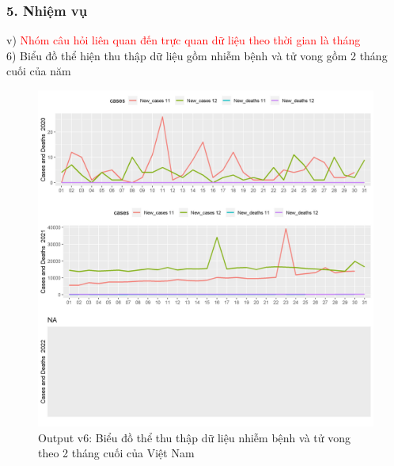 \documentclass[english,10pt,table]{beamer}
\begin{document}
\begin{frame}[fragile]
\frametitle{5.  Nhiệm vụ}
v) \textcolor{red}{Nhóm câu hỏi liên quan đến trực quan dữ liệu theo thời gian là tháng}\\
    6) Biểu đồ thể hiện thu thập dữ liệu gồm nhiễm bệnh và tử vong gồm 2 tháng cuối của năm
	\begin{figure}[h!]
	\begin{center}
		    \includegraphics[scale = 0.25]{Images/V/v6 Vietnam .jpeg}
		     \caption{Output v6: Biểu đồ thể thu thập dữ liệu nhiễm bệnh và tử vong theo 2 tháng cuối của Việt Nam}
		\end{center}
		\end{figure}
\end{frame}
\end{document}
